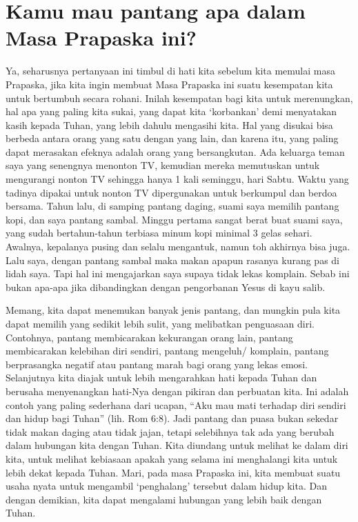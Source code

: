 
\section*{Kamu mau pantang apa dalam Masa Prapaska ini?}
Ya, seharusnya pertanyaan ini timbul di hati kita sebelum kita memulai masa Prapaska, jika kita ingin membuat Masa Prapaska ini suatu kesempatan kita untuk bertumbuh secara rohani. Inilah kesempatan bagi kita untuk merenungkan, hal apa yang paling kita sukai, yang dapat kita `korbankan' demi menyatakan kasih kepada Tuhan, yang lebih dahulu mengasihi kita. Hal yang disukai bisa berbeda antara orang yang satu dengan yang lain, dan karena itu, yang paling dapat merasakan efeknya adalah orang yang bersangkutan. Ada keluarga teman saya yang senengnya menonton TV, kemudian mereka memutuskan untuk mengurangi nonton TV sehingga hanya 1 kali seminggu, hari Sabtu. Waktu yang tadinya dipakai untuk nonton TV dipergunakan untuk berkumpul dan berdoa bersama. Tahun lalu, di samping pantang daging,  suami saya memilih pantang kopi, dan saya pantang sambal. Minggu pertama sangat berat buat suami saya, yang sudah bertahun-tahun terbiasa minum kopi minimal 3 gelas sehari. Awalnya, kepalanya pusing dan selalu mengantuk, namun toh akhirnya bisa juga. Lalu saya, dengan pantang sambal maka makan apapun rasanya kurang pas di lidah saya. Tapi hal ini mengajarkan saya supaya tidak lekas komplain. Sebab ini bukan apa-apa jika dibandingkan dengan pengorbanan Yesus di kayu salib.

Memang, kita dapat menemukan banyak jenis pantang, dan mungkin pula kita dapat memilih yang  sedikit lebih sulit, yang melibatkan penguasaan diri. Contohnya, pantang membicarakan kekurangan orang lain, pantang membicarakan kelebihan diri sendiri,  pantang mengeluh/ komplain, pantang berprasangka negatif atau pantang marah bagi orang yang lekas emosi. Selanjutnya kita diajak untuk lebih mengarahkan hati kepada Tuhan dan berusaha menyenangkan hati-Nya dengan pikiran dan perbuatan kita.  Ini adalah contoh yang paling sederhana dari ucapan, ``Aku mau mati terhadap diri sendiri dan hidup bagi Tuhan'' (lih. Rom 6:8). Jadi pantang dan puasa bukan sekedar tidak makan daging atau tidak jajan, tetapi selebihnya tak ada yang berubah dalam hubungan kita dengan Tuhan. Kita diundang untuk melihat ke dalam diri kita, untuk melihat kebiasaan apakah yang selama ini menghalangi kita untuk lebih dekat kepada Tuhan. Mari, pada masa Prapaska ini, kita membuat suatu usaha nyata untuk mengambil `penghalang' tersebut dalam hidup kita. Dan dengan demikian, kita dapat mengalami hubungan yang lebih baik dengan Tuhan.

